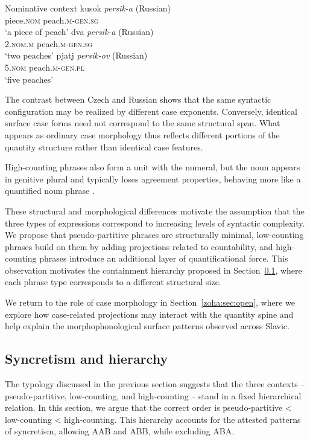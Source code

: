 \documentclass[output=paper,colorlinks,citecolor=brown
]{langscibook}
\begin{document}
\ea Nominative context \label{zoha:ex:russian}
    \ea \gll kusok \textit{persik-a} (Russian)\\
    piece.\textsc{nom} peach.\textsc{m}-\textsc{gen.sg}\\
    \glt `a piece of peach'
    \ex \gll dva \textit{persik-a} (Russian)\\
    2.\textsc{nom.m} peach.\textsc{m}-\textsc{gen.sg}\\
    \glt `two peaches'
    \ex \gll pjatj \textit{persik-ov} (Russian)\\
    5.\textsc{nom} peach.\textsc{m}-\textsc{gen.pl}\\
    \glt `five peaches'
    \z
\z

\noindent The contrast between Czech and Russian shows that the same syntactic configuration may be realized by different case exponents. Conversely, identical surface case forms need not correspond to the same structural span. What appears as ordinary case morphology thus reflects different portions of the quantity structure rather than identical case features.

High-counting phrases also form a unit with the numeral, but the noun appears in genitive plural and typically loses agreement properties, behaving more like a quantified noun phrase \citep{Franks1995,Pesetsky2013}.

These structural and morphological differences motivate the assumption that the three types of expressions correspond to increasing levels of syntactic complexity. We propose that pseudo-partitive phrases are structurally minimal, low-counting phrases build on them by adding projections related to countability, and high-counting phrases introduce an additional layer of quantificational force. This observation motivates the containment hierarchy proposed in Section~\ref{zoha:sec:syncretism}, where each phrase type corresponds to a different structural size.

We return to the role of case morphology in Section~\ref{zoha:sec:open}, where we explore how case-related projections may interact with the quantity spine and help explain the morphophonological surface patterns observed across Slavic.

\subsection{Syncretism and hierarchy}\label{zoha:sec:syncretism}

The typology discussed in the previous section suggests that the three contexts -- pseudo-partitive, low-counting, and high-counting -- stand in a fixed hierarchical relation. In this section, we argue that the correct order is pseudo-partitive < low-counting < high-counting. This hierarchy accounts for the attested patterns of syncretism, allowing AAB and ABB, while excluding ABA.
\end{document}

